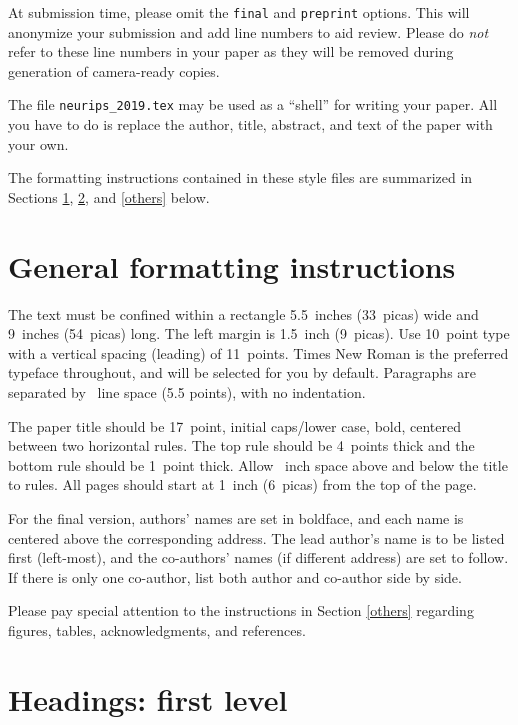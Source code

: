 \documentclass{article}
\begin{document}
	At submission time, please omit the \verb+final+ and \verb+preprint+
	options. This will anonymize your submission and add line numbers to aid
	review. Please do \emph{not} refer to these line numbers in your paper as they
	will be removed during generation of camera-ready copies.
	
	The file \verb+neurips_2019.tex+ may be used as a ``shell'' for writing your
	paper. All you have to do is replace the author, title, abstract, and text of
	the paper with your own.
	
	The formatting instructions contained in these style files are summarized in
	Sections \ref{gen_inst}, \ref{headings}, and \ref{others} below.
	
	\section{General formatting instructions}
	\label{gen_inst}
	
	The text must be confined within a rectangle 5.5~inches (33~picas) wide and
	9~inches (54~picas) long. The left margin is 1.5~inch (9~picas).  Use 10~point
	type with a vertical spacing (leading) of 11~points.  Times New Roman is the
	preferred typeface throughout, and will be selected for you by default.
	Paragraphs are separated by ~line space (5.5 points), with no
	indentation.
	
	The paper title should be 17~point, initial caps/lower case, bold, centered
	between two horizontal rules. The top rule should be 4~points thick and the
	bottom rule should be 1~point thick. Allow ~inch space above and
	below the title to rules. All pages should start at 1~inch (6~picas) from the
	top of the page.
	
	For the final version, authors' names are set in boldface, and each name is
	centered above the corresponding address. The lead author's name is to be listed
	first (left-most), and the co-authors' names (if different address) are set to
	follow. If there is only one co-author, list both author and co-author side by
	side.
	
	Please pay special attention to the instructions in Section \ref{others}
	regarding figures, tables, acknowledgments, and references.
	
	\section{Headings: first level}
	\label{headings}
	
\end{document}
